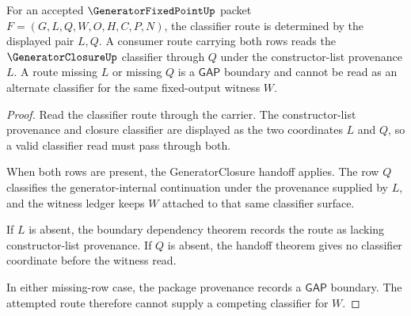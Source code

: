 \begin{theorem}
\label{thm:generator-fixed-point-classifier-row-gapped-determinacy}
For an accepted $\GeneratorFixedPointUp$ packet $F=(G,L,Q,W,O,H,C,P,N)$, the classifier route is determined by the displayed pair $L,Q$. A consumer route carrying both rows reads the $\GeneratorClosureUp$ classifier through $Q$ under the constructor-list provenance $L$. A route missing $L$ or missing $Q$ is a $\mathsf{GAP}$ boundary and cannot be read as an alternate classifier for the same fixed-output witness $W$.
\end{theorem}
\begin{proof}
Read the classifier route through the carrier. The constructor-list provenance and closure classifier are displayed as the two coordinates $L$ and $Q$, so a valid classifier read must pass through both.

When both rows are present, the GeneratorClosure handoff applies. The row $Q$ classifies the generator-internal continuation under the provenance supplied by $L$, and the witness ledger keeps $W$ attached to that same classifier surface.

If $L$ is absent, the boundary dependency theorem records the route as lacking constructor-list provenance. If $Q$ is absent, the handoff theorem gives no classifier coordinate before the witness read.

In either missing-row case, the package provenance records a $\mathsf{GAP}$ boundary. The attempted route therefore cannot supply a competing classifier for $W$.
\end{proof}


